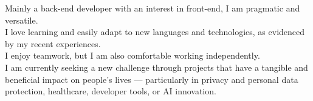 \documentclass[8pt]{developercv} %
\begin{document}
\begin{minipage}[t]{0.51\textwidth} %
	\vspace{-0.5\baselineskip} %

	Mainly a back-end developer with an interest in front-end, I am pragmatic and versatile.\\
	I love learning and easily adapt to new languages and technologies, as evidenced by my recent experiences.\\
	I enjoy teamwork, but I am also comfortable working independently.\\

	I am currently seeking a new challenge through projects that have a tangible and beneficial impact on people's lives — particularly in privacy and personal data protection, healthcare, developer tools, or AI innovation.
\end{minipage}
\hfill %
\begin{minipage}[t]{0.45\textwidth} %
	\vspace{-2\baselineskip} %
	\begin{barchart}{5.5}
	\end{barchart}
\end{minipage}

\vspace{-\baselineskip} %
\end{document}

